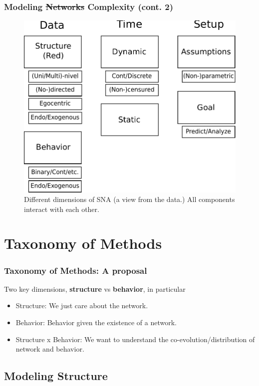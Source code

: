 \documentclass[aspectratio=169,10pt]{beamer}
\begin{document}
\begin{frame}
	\frametitle{Modeling \st{Networks} Complexity (cont. 2)}
	\begin{figure}
		\centering
		\includegraphics[width=.6\linewidth]{diagrama-en.pdf}
		\caption{Different dimensions of SNA (a view from the data.) All components interact with each other.}
	\end{figure}

\end{frame}

\section{Taxonomy of Methods}


\begin{frame}
	\frametitle{Taxonomy of Methods: A proposal}
	
	Two key dimensions, \textbf{structure} vs \textbf{behavior}, in particular\pause
	\begin{itemize}
		\item Structure: We just care about the network.\pause
		\item Behavior: Behavior given the existence of a network.\pause
		\item Structure x Behavior: We want to understand the co-evolution/distribution of network and behavior.
	\end{itemize}

\end{frame}

\subsection{Modeling Structure}
\end{document}
